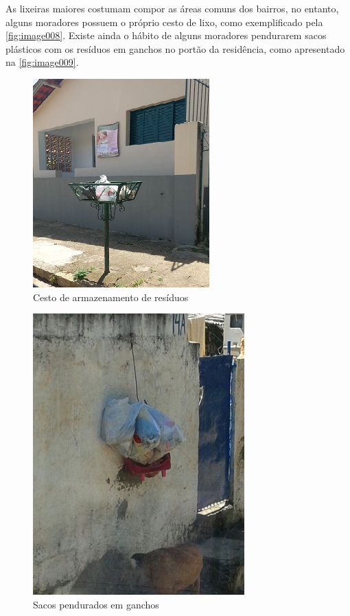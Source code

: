 		 	
	As lixeiras maiores costumam compor as áreas comuns dos bairros, no entanto, alguns moradores possuem o próprio cesto de lixo, como exemplificado pela \autoref{fig:image008}. Existe ainda o hábito de alguns moradores pendurarem sacos plásticos com os resíduos em ganchos no portão da residência, como apresentado na \autoref{fig:image009}.
	
	\begin{figure}
		\centering
		\includegraphics[width=0.75\linewidth]{produtos/prodtres/image008}
		\caption{Cesto de armazenamento de resíduos}
		\label{fig:image008}
	\end{figure}	
		
				
	\begin{figure}
		\centering
		\includegraphics[width=0.75\linewidth]{produtos/prodtres/image009}
		\caption{Sacos pendurados em ganchos}
		\label{fig:image009}
	\end{figure}
		
